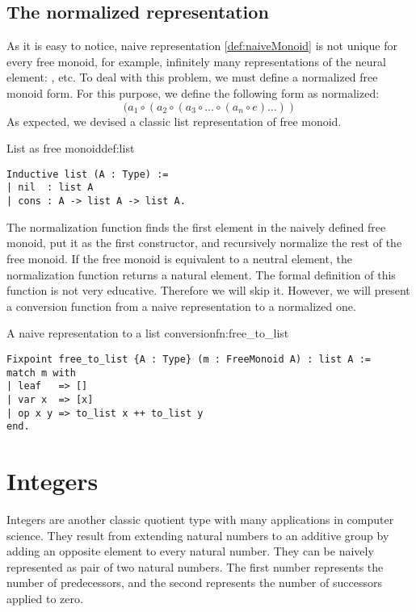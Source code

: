 \subsection{The normalized representation}
As it is easy to notice, naive representation \ref{def:naiveMonoid} is not unique for every free monoid, for example, infinitely many representations of the neural element: ,  etc. To deal with this problem, we must define a normalized free monoid form. For this purpose, we define the following form as normalized:
$$
    (a_1 \circ (a_2 \circ (a_3 \circ \dots  \circ (a_n \circ e) \dots ))
$$
As expected, we devised a classic list representation of free monoid. 
\begin{defi}{List as free monoid}{def:list}
\begin{verbatim}
Inductive list (A : Type) :=
| nil  : list A
| cons : A -> list A -> list A.
\end{verbatim}
\end{defi}
The normalization function finds the first element in the naively defined free monoid, put it as the first constructor, and recursively normalize the rest of the free monoid. If the free monoid is equivalent to a neutral element, the normalization function returns a natural element. The formal definition of this function is not very educative. Therefore we will skip it. However, we will present a conversion function from a naive representation to a normalized one.
\begin{func}{A naive representation to a list conversion}{fn:free_to_list}
\begin{verbatim}
Fixpoint free_to_list {A : Type} (m : FreeMonoid A) : list A :=
match m with
| leaf   => []
| var x  => [x]
| op x y => to_list x ++ to_list y
end.
\end{verbatim}
\end{func}
\section{Integers}
Integers are another classic quotient type with many applications in computer science. They result from extending natural numbers to an additive group by adding an opposite element to every natural number. They can be naively represented as pair of two natural numbers. The first number represents the number of predecessors, and the second represents the number of successors applied to zero.
